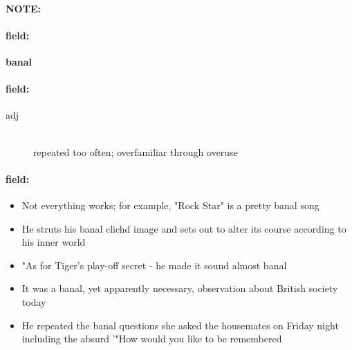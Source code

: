 \documentclass[12pt]{article}
\newenvironment{note}{\paragraph{NOTE:}}{}
\newenvironment{field}{\paragraph{field:}}{}
\begin{document}
\begin{note}
\begin{field}
\textbf{\large banal}
\end{field}


\begin{field}
\begin{description}
\item[adj] \hfill \\ 
repeated too often; overfamiliar through overuse

\end{description}
\end{field}

\begin{field}
\begin{itemize}
\item Not everything works; for example, "Rock Star" is a pretty banal song
\item He struts his banal clichd image and sets out to alter its course according to his inner world
\item "As for Tiger's play-off secret - he made it sound almost banal
\item It was a banal, yet apparently necessary, observation about British society today
\item He repeated the banal questions she asked the housemates on Friday night including the absurd '"How would you like to be remembered
\end{itemize}
\end{field}
\end{note}
\end{document}
